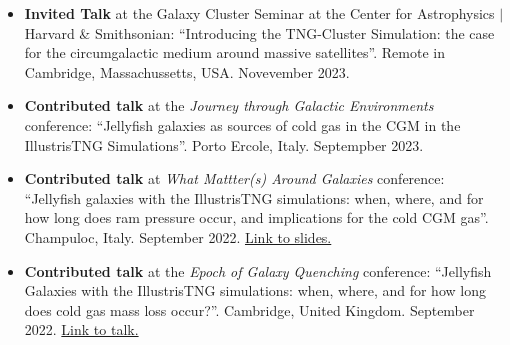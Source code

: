 \documentclass[a4paper,10pt,oneside]{article}
\begin{document}
\begin{itemize}[wide, labelwidth=!, labelindent=-11pt, parsep=0pt]
    \item {\bf Invited Talk} at the Galaxy Cluster Seminar at the Center for Astrophysics $\vert$ Harvard \& Smithsonian: ``Introducing the TNG-Cluster Simulation: the case for the circumgalactic medium around massive satellites''. Remote in Cambridge, Massachussetts, USA. Novevember 2023. 
    \item {\bf Contributed talk} at the {\it Journey through Galactic Environments} conference: ``Jellyfish galaxies as sources of cold gas in the CGM in the IllustrisTNG Simulations''. Porto Ercole, Italy. Septempber 2023.
    \item {\bf Contributed talk} at {\it What Mattter(s) Around Galaxies} conference: ``Jellyfish galaxies with the IllustrisTNG simulations: when, where, and for how long does ram pressure occur, and implications for the cold CGM gas''. Champuloc, Italy. September 2022. \href{https://drive.google.com/file/u/0/d/1x4FNVCmUWTFwznOAs9RYhLwkKl-kmhZT/view?usp=drive_web}{Link to slides.}
    \item {\bf Contributed talk} at the {\it Epoch of Galaxy Quenching} conference: ``Jellyfish Galaxies with the IllustrisTNG simulations: when, where, and for how long does cold gas mass loss occur?''. Cambridge, United Kingdom. September 2022. \href{https://sites.google.com/cam.ac.uk/quenching/programme#h.ohkoyw4ilbje}{Link to talk.}

\end{itemize}
\end{document}
